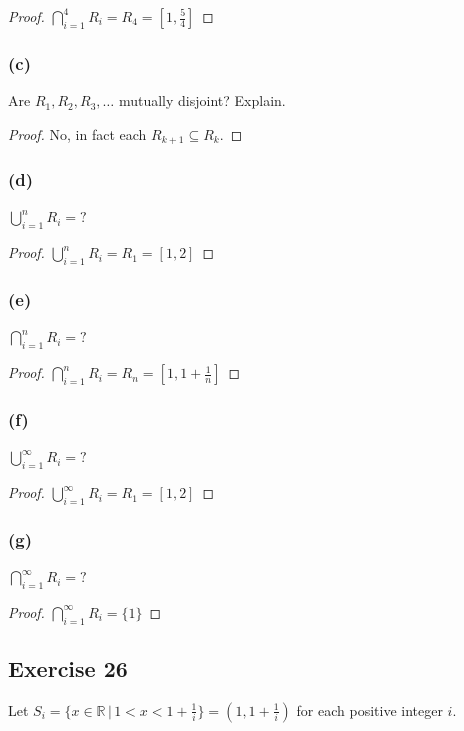 \documentclass[14pt]{extarticle}
\newcommand{\dps}{\displaystyle}
\newcommand{\R}{\mathbb{R}}
\begin{document}
\begin{proof}
\(\dps \bigcap_{i=1}^{4}R_i = R_4 = \left[1, \frac{5}{4}\right]\)
\end{proof}

\subsubsection{(c)}
Are \(R_1, R_2, R_3, \ldots\) mutually disjoint? Explain.

\begin{proof}
No, in fact each \(R_{k+1} \subseteq R_k\).
\end{proof}

\subsubsection{(d)}
\(\dps \bigcup_{i=1}^{n}R_i = ?\)

\begin{proof}
\(\dps \bigcup_{i=1}^{n}R_i = R_1 = [1, 2]\)
\end{proof}

\subsubsection{(e)}
\(\dps \bigcap_{i=1}^{n}R_i = ?\)

\begin{proof}
\(\dps \bigcap_{i=1}^{n}R_i = R_n = \left[1, 1+\frac{1}{n}\right]\)
\end{proof}

\subsubsection{(f)}
\(\dps \bigcup_{i=1}^{\infty}R_i = ?\)

\begin{proof}
\(\dps \bigcup_{i=1}^{\infty}R_i = R_1 = [1, 2]\)
\end{proof}

\subsubsection{(g)}
\(\dps \bigcap_{i=1}^{\infty}R_i = ?\)

\begin{proof}
\(\dps \bigcap_{i=1}^{\infty}R_i = \{1\}\)
\end{proof}

\subsection{Exercise 26}
Let \(S_i = \{x \in \R \,|\, 1 < x < 1 + \frac{1}{i}\} = \left(1, 1 + \frac{1}{i}\right)\) 
for each positive integer $i$.
\end{document}
